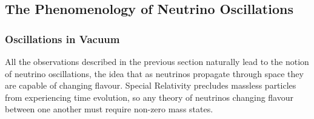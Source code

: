 \subsection{The Phenomenology of Neutrino Oscillations}\label{sec:nu_osc_phenom}
\subsubsection{Oscillations in Vacuum}\label{sec:nu_osc_phenom_vacuum}
All the observations described in the previous section naturally lead to the notion of neutrino oscillations, the idea that as neutrinos propagate through space they are capable of changing flavour. Special Relativity precludes massless particles from experiencing time evolution, so any theory of neutrinos changing flavour between one another must require non-zero mass states.

